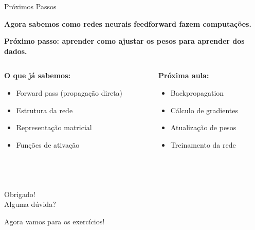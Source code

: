 \documentclass[xcolor=dvipsnames,t,aspectratio=169]{beamer}
\newcommand{\highlight}[1]{{\color{nes_dark_orange} #1}}
\begin{document}
\begin{frame}[c]{Próximos Passos}
    \begin{center}
        \Large
        \textbf{Agora sabemos como redes neurais feedforward fazem computações.}
        
        \vspace{.25cm}
        
        \textbf{Próximo passo: aprender como ajustar os pesos para aprender dos dados.}
    \end{center}
    
    \vspace{1cm}
    
    \begin{columns}[c]
        \begin{column}{0.5\textwidth}
            \textbf{O que já sabemos:}
            \begin{itemize}
                \item Forward pass (propagação direta)
                \item Estrutura da rede
                \item Representação matricial
                \item Funções de ativação
            \end{itemize}
        \end{column}
        \begin{column}{0.5\textwidth}
            \textbf{Próxima aula:}
            \begin{itemize}
                \item \highlight{Backpropagation}
                \item Cálculo de gradientes
                \item Atualização de pesos
                \item Treinamento da rede
            \end{itemize}
        \end{column}
    \end{columns}

\end{frame}


\begin{frame}
    \frametitle{~}
        \vfill
        \begin{center}
            {\Huge Obrigado!}\vspace{1.5em}\\
            {\Large \highlight{Alguma dúvida?}}\\
        \end{center}
        \vfill
        \begin{center}
            {\small Agora vamos para os exercícios!}
        \end{center}
\end{frame}
\end{document}
